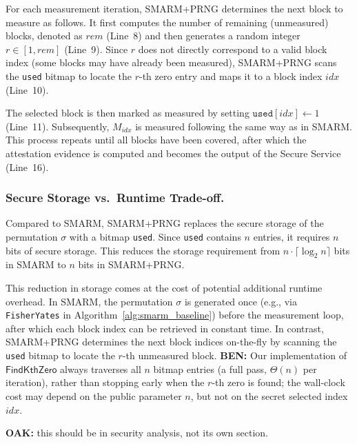 \documentclass{ieeeaccess}
\DeclareRobustCommand{\oak}[1]{{\color{OAKcolor}\textbf{OAK:} #1}}
\DeclareRobustCommand{\ben}[1]{{\color{BENcolor}\textbf{BEN:} #1}}
\newcommand{\rtsmarmone}{SMARM+PRNG\xspace}
\begin{document}
For each measurement iteration, \rtsmarmone determines the next block to measure as follows.
It first computes the number of remaining (unmeasured) blocks, denoted as $rem$ (Line~8) and then generates a random integer $r \in [1, rem]$ (Line~9).
Since $r$ does not directly correspond to a valid block index (some blocks may have already been measured), \rtsmarmone scans the \texttt{used} bitmap to locate the $r$-th zero entry and maps it to a block index $idx$ (Line~10).

The selected block is then marked as measured by setting $\texttt{used}[idx] \leftarrow 1$ (Line~11).
Subsequently, $M_{idx}$ is measured following the same way as in SMARM.
This process repeats until all blocks have been covered, after which the attestation evidence is computed and becomes the output of the Secure Service (Line~16).

\subsubsection{Secure Storage vs.\ Runtime Trade-off.}
Compared to SMARM, \rtsmarmone replaces the secure storage of the permutation $\sigma$ with a bitmap \texttt{used}.
Since \texttt{used} contains $n$ entries, it requires $n$ bits of secure storage.
This reduces the storage requirement from $n \cdot \lceil \log_2 n \rceil$ bits in SMARM to $n$ bits in \rtsmarmone.

This reduction in storage comes at the cost of potential additional runtime overhead.
In SMARM, the permutation $\sigma$ is generated once (e.g., via \texttt{FisherYates} in Algorithm~\ref{alg:smarm_baseline}) before the measurement loop, after which each block index can be retrieved in constant time.
In contrast, \rtsmarmone determines the next block indices on-the-fly by scanning the \texttt{used} bitmap to locate the $r$-th unmeasured block.
\ben{Our implementation of $\mathsf{FindKthZero}$ always traverses all $n$ bitmap entries (a full pass, $\Theta(n)$ per iteration), rather than stopping early when the $r$-th zero is found; the wall-clock cost may depend on the public parameter $n$, but not on the secret selected index $idx$.}

\oak{this should be in security analysis, not its own section.}
\end{document}
